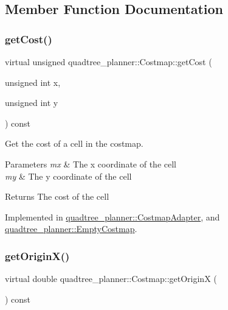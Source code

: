 \subsection{Member Function Documentation}
\mbox{\label{classquadtree__planner_1_1Costmap_ada8d9915ad1b73637730fe65be8d291d}} 
\subsubsection{\texorpdfstring{get\+Cost()}{getCost()}}
{\footnotesize\ttfamily virtual unsigned quadtree\+\_\+planner\+::\+Costmap\+::get\+Cost (\begin{DoxyParamCaption}\item[{unsigned int}]{x,  }\item[{unsigned int}]{y }\end{DoxyParamCaption}) const\hspace{0.3cm}{\ttfamily [pure virtual]}}



Get the cost of a cell in the costmap. 


\begin{DoxyParams}{Parameters}
{\em mx} & The x coordinate of the cell \\
\hline
{\em my} & The y coordinate of the cell \\
\hline
\end{DoxyParams}
\begin{DoxyReturn}{Returns}
The cost of the cell 
\end{DoxyReturn}


Implemented in \hyperlink{classquadtree__planner_1_1CostmapAdapter_af5b15c508adabc428aabde14253c9468}{quadtree\+\_\+planner\+::\+Costmap\+Adapter}, and \hyperlink{classquadtree__planner_1_1EmptyCostmap_a2d952b1e51adc413b4ca767e4cd082dc}{quadtree\+\_\+planner\+::\+Empty\+Costmap}.

\mbox{\label{classquadtree__planner_1_1Costmap_a8fda39ff20cf58f6700705dae7bd3a0b}} 
\subsubsection{\texorpdfstring{get\+Origin\+X()}{getOriginX()}}
{\footnotesize\ttfamily virtual double quadtree\+\_\+planner\+::\+Costmap\+::get\+OriginX (\begin{DoxyParamCaption}{ }\end{DoxyParamCaption}) const\hspace{0.3cm}{\ttfamily [pure virtual]}}



